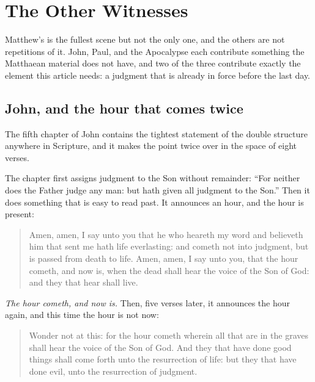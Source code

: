 \section{The Other Witnesses}\label{sec:witnesses}

Matthew's is the fullest scene but not the only one, and the others are not repetitions of it. John, Paul, and the Apocalypse each contribute something the Matthaean material does not have, and two of the three contribute exactly the element this article needs: a judgment that is already in force before the last day.

\subsection{John, and the hour that comes twice}

The fifth chapter of John contains the tightest statement of the double structure anywhere in Scripture, and it makes the point twice over in the space of eight verses.

The chapter first assigns judgment to the Son without remainder: ``For neither does the Father judge any man: but hath given all judgment to the Son.'' Then it does something that is easy to read past. It announces an hour, and the hour is present:

\begin{quote}
Amen, amen, I say unto you that he who heareth my word and believeth him that sent me hath life everlasting: and cometh not into judgment, but is passed from death to life. Amen, amen, I say unto you, that the hour cometh, and now is, when the dead shall hear the voice of the Son of God: and they that hear shall live.
\end{quote}

\emph{The hour cometh, and now is.} Then, five verses later, it announces the hour again, and this time the hour is not now:

\begin{quote}
Wonder not at this: for the hour cometh wherein all that are in the graves shall hear the voice of the Son of God. And they that have done good things shall come forth unto the resurrection of life: but they that have done evil, unto the resurrection of judgment.
\end{quote}


